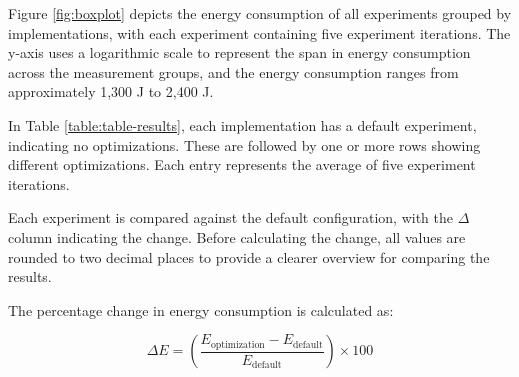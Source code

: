 \documentclass[main.tex]{subfiles}
\begin{document}
Figure \ref{fig:boxplot} depicts the energy consumption of all experiments grouped by implementations, with each experiment containing five experiment iterations. The y-axis uses a logarithmic scale to represent the span in energy consumption across the measurement groups, and the energy consumption ranges from approximately 1,300 J to 2,400 J.



In Table \ref{table:table-results}, each implementation has a default experiment, indicating no optimizations. These are followed by one or more rows showing different optimizations. Each entry represents the average of five experiment iterations.

Each experiment is compared against the default configuration, with the  $\Delta$ column indicating the change. Before calculating the change, all values are rounded to two decimal places to provide a clearer overview for comparing the results.

The percentage change in energy consumption is calculated as:

\[
\Delta E = \left( \frac{E_{\text{optimization}} - E_{\text{default}}}{E_{\text{default}}} \right) \times 100
\]
\end{document}
